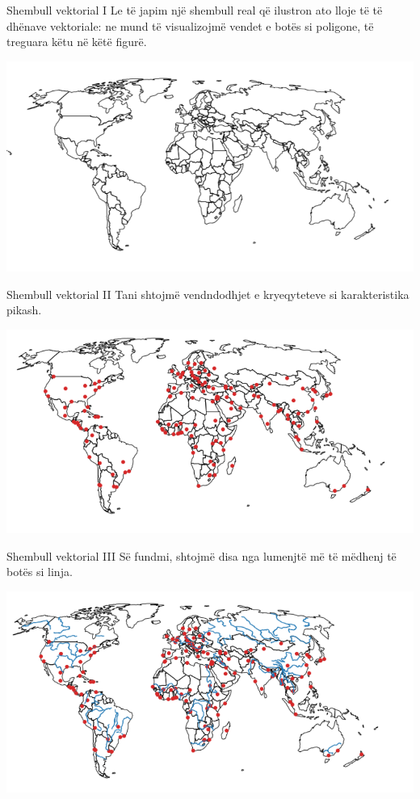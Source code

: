 \documentclass[
  ignorenonframetext,
]{beamer}
\begin{document}
\begin{frame}{Shembull vektorial I}
\protect\hypertarget{shembull-vektorial-i}{}
Le të japim një shembull real që ilustron ato lloje të të dhënave
vektoriale: ne mund të visualizojmë vendet e botës si poligone, të
treguara këtu në këtë figurë.

\includegraphics{./Figs/world.png}
\end{frame}

\begin{frame}{Shembull vektorial II}
\protect\hypertarget{shembull-vektorial-ii}{}
Tani shtojmë vendndodhjet e kryeqyteteve si karakteristika pikash.

\includegraphics{./Figs/capital.png}
\end{frame}

\begin{frame}{Shembull vektorial III}
\protect\hypertarget{shembull-vektorial-iii}{}
Së fundmi, shtojmë disa nga lumenjtë më të mëdhenj të botës si linja.

\includegraphics{./Figs/capline.png}
\end{frame}
\end{document}

